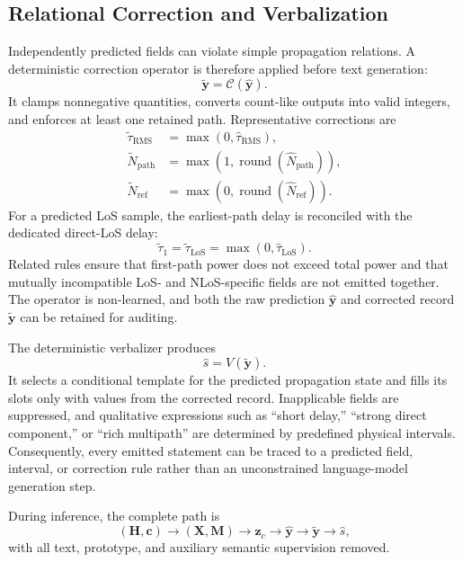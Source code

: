 \subsection{Relational Correction and Verbalization}
\label{subsec:correction-verbalization}

Independently predicted fields can violate simple propagation relations. A deterministic correction
operator is therefore applied before text generation:
\begin{equation}
\widetilde{\mathbf y}=\mathcal C(\hat{\mathbf y}).
\label{eq:deterministic-correction}
\end{equation}
It clamps nonnegative quantities, converts count-like outputs into valid integers, and enforces at least
one retained path. Representative corrections are
\begin{align}
\widetilde{\tau}_{\mathrm{RMS}}
&=\max(0,\hat{\tau}_{\mathrm{RMS}}),
\label{eq:spread-correction}\\
\widetilde N_{\mathrm{path}}
&=\max\!\left(1,\operatorname{round}(\hat N_{\mathrm{path}})\right),
\label{eq:path-count-correction}\\
\widetilde N_{\mathrm{ref}}
&=\max\!\left(0,\operatorname{round}(\hat N_{\mathrm{ref}})\right).
\label{eq:reflection-count-correction}
\end{align}
For a predicted LoS sample, the earliest-path delay is reconciled with the dedicated direct-LoS delay:
\begin{equation}
\widetilde\tau_1
=\widetilde\tau_{\mathrm{LoS}}
=\max(0,\hat\tau_{\mathrm{LoS}}).
\label{eq:los-delay-correction}
\end{equation}
Related rules ensure that first-path power does not exceed total power and that mutually incompatible
LoS- and NLoS-specific fields are not emitted together. The operator is non-learned, and both the raw
prediction $\hat{\mathbf y}$ and corrected record $\widetilde{\mathbf y}$ can be retained for auditing.

The deterministic verbalizer produces
\begin{equation}
\hat{s}=V(\widetilde{\mathbf y}).
\label{eq:deterministic-verbalization}
\end{equation}
It selects a conditional template for the predicted propagation state and fills its slots only with
values from the corrected record. Inapplicable fields are suppressed, and qualitative expressions such
as ``short delay,'' ``strong direct component,'' or ``rich multipath'' are determined by predefined
physical intervals. Consequently, every emitted statement can be traced to a predicted field, interval,
or correction rule rather than an unconstrained language-model generation step.

During inference, the complete path is
\begin{equation}
(\mathbf H,\mathbf c)
\rightarrow(\mathbf X,\mathbf M)
\rightarrow\mathbf z_c
\rightarrow\hat{\mathbf y}
\rightarrow\widetilde{\mathbf y}
\rightarrow\hat{s},
\label{eq:complete-test-path}
\end{equation}
with all text, prototype, and auxiliary semantic supervision removed.
